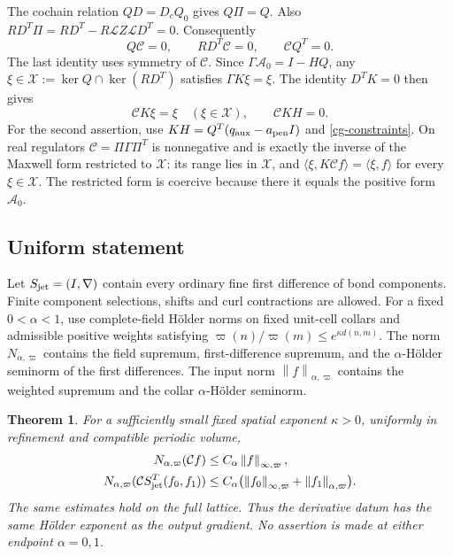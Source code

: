 \documentclass[11pt]{article}
\newtheorem{theorem}{Theorem}[section]
\theoremstyle{remark}
\newcommand{\norm}[1]{\left\|#1\right\|}
\begin{document}
The cochain relation $QD=D_cQ_0$ gives $Q\Pi=Q$.
Also $RD^T\Pi=RD^T-R\mathcal LZ\mathcal LD^T=0$.
Consequently
\begin{equation}\label{cg-constraints}
 Q\mathcal C=0,\qquad RD^T\mathcal C=0,
 \qquad \mathcal C Q^T=0.
\end{equation}
The last identity uses symmetry of $\mathcal C$.
Since $\Gamma\mathcal A_0=I-HQ$, any
$\xi\in\mathcal X:=\ker Q\cap\ker(RD^T)$ satisfies
$\Gamma K\xi=\xi$. The identity $D^TK=0$ then gives
\begin{equation}\label{cg-inverse-identities}
 \mathcal CK\xi=\xi\quad(\xi\in\mathcal X),
 \qquad \mathcal CKH=0.
\end{equation}
For the second assertion, use
$KH=Q^T(q_{\rm aux}-a_{\rm pen}I)$ and
\eqref{cg-constraints}. On real regulators
$\mathcal C=\Pi\Gamma\Pi^T$ is nonnegative and is exactly
the inverse of the Maxwell form restricted to $\mathcal X$:
its range lies in $\mathcal X$, and
$\langle\xi,K\mathcal Cf\rangle=\langle\xi,f\rangle$
for every $\xi\in\mathcal X$.
The restricted form is coercive because there it equals the
positive form $\mathcal A_0$.

\subsection{Uniform statement}
\label{cg-statement}

Let $S_{\rm jet}=(I,\nabla)$ contain every ordinary fine first
difference of bond components. Finite component selections,
shifts and curl contractions are allowed. For a fixed
$0<\alpha<1$, use complete-field H\"older norms on fixed unit-cell
collars and admissible positive weights satisfying
$\varpi(n)/\varpi(m)\le e^{\kappa d(n,m)}$.
The norm $N_{\alpha,\varpi}$ contains the field supremum,
first-difference supremum, and the $\alpha$-H\"older seminorm of
the first differences. The input norm
$\norm{f}_{\alpha,\varpi}$ contains the weighted supremum and
the collar $\alpha$-H\"older seminorm.

\begin{theorem}\label{cg-schauder}
For a sufficiently small fixed spatial exponent $\kappa>0$,
uniformly in refinement and compatible periodic volume,
\begin{align}
 N_{\alpha,\varpi}(\mathcal Cf)
       &\le C_\alpha\norm{f}_{\infty,\varpi},
                                                    \label{cg-bounded}\\
 N_{\alpha,\varpi}
   (\mathcal CS_{\rm jet}^T(f_0,f_1))
       &\le C_\alpha\bigl(\norm{f_0}_{\infty,\varpi}
                          +\norm{f_1}_{\alpha,\varpi}\bigr).
                                                    \label{cg-jet}
\end{align}
The same estimates hold on the full lattice. Thus the derivative
datum has the same H\"older exponent as the output gradient.
No assertion is made at either endpoint $\alpha=0,1$.
\end{theorem}
\end{document}
